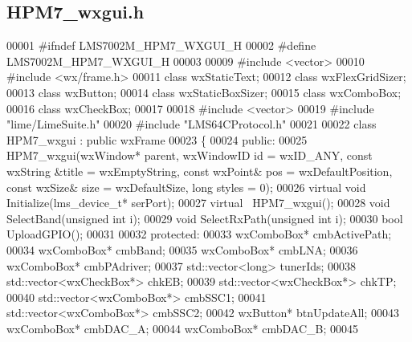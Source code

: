 \subsection{H\+P\+M7\+\_\+wxgui.\+h}
\label{HPM7__wxgui_8h_source}

\begin{DoxyCode}
00001 \textcolor{preprocessor}{#ifndef LMS7002M\_HPM7\_WXGUI\_H}
00002 \textcolor{preprocessor}{#define LMS7002M\_HPM7\_WXGUI\_H}
00003 
00009 \textcolor{preprocessor}{#include <vector>}
00010 \textcolor{preprocessor}{#include <wx/frame.h>}
00011 \textcolor{keyword}{class }wxStaticText;
00012 \textcolor{keyword}{class }wxFlexGridSizer;
00013 \textcolor{keyword}{class }wxButton;
00014 \textcolor{keyword}{class }wxStaticBoxSizer;
00015 \textcolor{keyword}{class }wxComboBox;
00016 \textcolor{keyword}{class }wxCheckBox;
00017 
00018 \textcolor{preprocessor}{#include <vector>}
00019 \textcolor{preprocessor}{#include "lime/LimeSuite.h"}
00020 \textcolor{preprocessor}{#include "LMS64CProtocol.h"}
00021 
00022 \textcolor{keyword}{class }HPM7_wxgui : \textcolor{keyword}{public} wxFrame
00023 \{
00024 \textcolor{keyword}{public}:
00025     HPM7_wxgui(wxWindow* parent, wxWindowID \textcolor{keywordtype}{id} = wxID\_ANY, \textcolor{keyword}{const} wxString &title = wxEmptyString, \textcolor{keyword}{const} 
      wxPoint& pos = wxDefaultPosition, \textcolor{keyword}{const} wxSize& size = wxDefaultSize, \textcolor{keywordtype}{long} styles = 0);
00026     \textcolor{keyword}{virtual} \textcolor{keywordtype}{void} Initialize(lms_device_t* serPort);
00027     \textcolor{keyword}{virtual} ~HPM7_wxgui();
00028     \textcolor{keywordtype}{void} SelectBand(\textcolor{keywordtype}{unsigned} \textcolor{keywordtype}{int} i);
00029     \textcolor{keywordtype}{void} SelectRxPath(\textcolor{keywordtype}{unsigned} \textcolor{keywordtype}{int} i);
00030     \textcolor{keywordtype}{bool} UploadGPIO();
00031 
00032 \textcolor{keyword}{protected}:
00033     wxComboBox* cmbActivePath;
00034     wxComboBox* cmbBand;
00035     wxComboBox* cmbLNA;
00036     wxComboBox* cmbPAdriver;
00037     std::vector<long> tunerIds;
00038     std::vector<wxCheckBox*> chkEB;
00039     std::vector<wxCheckBox*> chkTP;
00040     std::vector<wxComboBox*> cmbSSC1;
00041     std::vector<wxComboBox*> cmbSSC2;
00042     wxButton* btnUpdateAll;
00043     wxComboBox* cmbDAC_A;
00044     wxComboBox* cmbDAC_B;
00045 

\end{DoxyCode}

